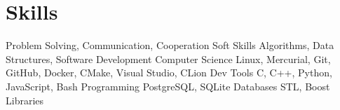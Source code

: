 \section{Skills}

\begin{itemize}
    \cventryii
        {Problem Solving, Communication, Cooperation}
        {Soft Skills}
    \cventryii
        {Algorithms, Data Structures, Software Development}
        {Computer Science}
    \cventryii
        {Linux, Mercurial, Git, GitHub, Docker, CMake, Visual Studio, CLion}
        {Dev Tools}
    \cventryii
        {C, C++, Python, JavaScript, Bash}
        {Programming}
    \cventryii
        {PostgreSQL, SQLite}
        {Databases}
    \cventryii
        {STL, Boost}
        {Libraries}
\end{itemize}
